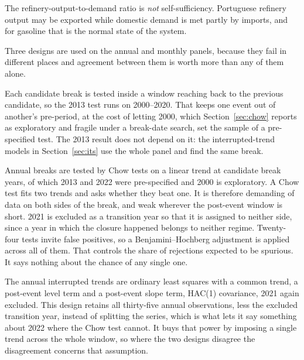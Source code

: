 \documentclass[11pt,a4paper]{article}
\begin{document}
The refinery-output-to-demand ratio is \emph{not} self-sufficiency. Portuguese refinery output
may be exported while domestic demand is met partly by imports, and for gasoline that is the
normal state of the system.

Three designs are used on the annual and monthly panels, because they fail in different places
and agreement between them is worth more than any of them alone.

Each candidate break is tested inside a window reaching back to the previous candidate, so the
2013 test runs on 2000--2020. That keeps one event out of another's pre-period, at the cost of
letting 2000, which Section~\ref{sec:chow} reports as exploratory and fragile under a break-date
search, set the sample of a pre-specified test. The 2013 result does not depend on it: the
interrupted-trend models in Section~\ref{sec:its} use the whole panel and find the same break.

Annual breaks are tested by Chow tests on a linear trend at candidate break years, of which 2013
and 2022 were pre-specified and 2000 is exploratory. A Chow test \citep{chow1960tests} fits two
trends and asks whether they beat one. It is therefore demanding of data on both sides of the
break, and weak wherever the post-event window is short. 2021 is excluded as a transition year
so that it is assigned to neither side, since a year in which the closure happened belongs to
neither regime. Twenty-four tests invite false positives, so a Benjamini--Hochberg adjustment
\citep{benjamini1995controlling} is applied across all of them. That controls the share of
rejections expected to be spurious. It says nothing about the chance of any single one.

The annual interrupted trends are ordinary least squares with a common trend, a post-event level
term and a post-event slope term, HAC(1) covariance, 2021 again excluded. This design retains
all thirty-five annual observations, less the excluded transition year, instead of splitting the
series, which is what lets it say something about 2022 where the Chow test cannot. It buys that
power by imposing a single trend across the whole window, so where the two designs disagree the
disagreement concerns that assumption.
\end{document}
